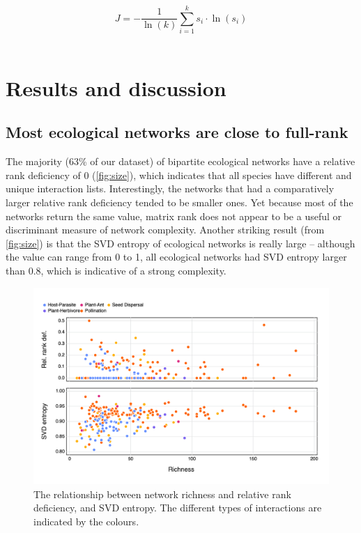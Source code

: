 \[J = -\frac{1}{\ln(k)}\sum_{i=1}^k s_i\cdot\ln(s_i)\]\

\section{Results and discussion}\label{results-and-discussion}

\subsection{Most ecological networks are close to
full-rank}\label{most-ecological-networks-are-close-to-full-rank}

The majority (63\% of our dataset) of bipartite ecological networks have a
relative rank deficiency of 0 (\autoref{fig:size}), which indicates that all
species have different and unique interaction lists. Interestingly, the networks
that had a comparatively larger relative rank deficiency tended to be smaller
ones. Yet because most of the networks return the same value, matrix rank does
not appear to be a useful or discriminant measure of network complexity. Another
striking result (from \autoref{fig:size}) is that the SVD entropy of ecological
networks is really large -- although the value can range from 0 to 1, all
ecological networks had SVD entropy larger than 0.8, which is indicative of a
strong complexity.

\begin{figure}[h]
    \centering
    \includegraphics[width=\textwidth]{figures/size_v_rankentropy.png}
    \caption{The relationship between network richness and relative rank
deficiency, and SVD entropy. The different types of interactions are indicated
by the colours.}
    \label{fig:size}
\end{figure}

